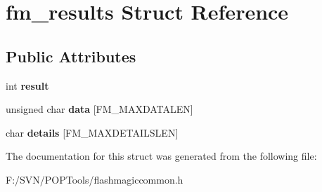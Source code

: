 \hypertarget{structfm__results}{\section{fm\-\_\-results Struct Reference}
\label{structfm__results}
}
\subsection*{Public Attributes}
\begin{DoxyCompactItemize}
\item 
\hypertarget{structfm__results_aa310a4cd9d65c40ffdf4e47592060479}{int {\bfseries result}}\label{structfm__results_aa310a4cd9d65c40ffdf4e47592060479}

\item 
\hypertarget{structfm__results_a62f9392c15760cabe0a59398e02c16b1}{unsigned char {\bfseries data} \mbox{[}F\-M\-\_\-\-M\-A\-X\-D\-A\-T\-A\-L\-E\-N\mbox{]}}\label{structfm__results_a62f9392c15760cabe0a59398e02c16b1}

\item 
\hypertarget{structfm__results_ad7fc604180eedd70d34e049e8c92576b}{char {\bfseries details} \mbox{[}F\-M\-\_\-\-M\-A\-X\-D\-E\-T\-A\-I\-L\-S\-L\-E\-N\mbox{]}}\label{structfm__results_ad7fc604180eedd70d34e049e8c92576b}

\end{DoxyCompactItemize}


The documentation for this struct was generated from the following file\-:\begin{DoxyCompactItemize}
\item 
F\-:/\-S\-V\-N/\-P\-O\-P\-Tools/flashmagiccommon.\-h\end{DoxyCompactItemize}
